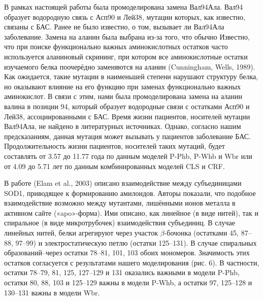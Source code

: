 В рамках настоящей работы была промоделирована замена Вал94Ала. Вал94 образует водородную связь с Асп90 и Лей38, мутации которых, как известно, связаны с БАС. Ранее не было известно, о том, вызывает ли Вал94Ала заболевание. Замена на аланин была выбрана из-за того, что обычно
Известно, что при поиске функционально важных аминокислотных остатков часто используется аланиновый скрининг, при котором все аминокислотные остатки изучаемого белка поочерёдно заменяются на аланин (Cunningham, Wells, 1989). Как ожидается, такие мутации в наименьшей степени нарушают структуру белка, но оказывают влияние на его функцию при заменах функционально важных аминокислот. В связи с этим, нами была промоделирована замена на аланин валина в позиции 94,  который образует водородные связи с остатками Асп90 и Лей38, ассоциированными с БАС. Время жизни пациентов, носителей мутации Вал94Ала, не найдено в литературных источниках. Однако, согласно нашим предсказаниям, данная мутация может вызывать у пациентов заболевание БАС. Продолжительность жизни пациентов, носителей таких мутаций, будет составлять от 3.57 до 11.77 года по данным моделей P-Phb, P-Whb и Wbr или от 4.09 до 5.71 лет по данным комбинированных моделей CLS и CRF. 

В работе (Elam et al., 2003) описано взаимодействие между субъединицами SOD1, приводящее к формированию амилоидов. Авторы показали, что подобное взаимодействие возможно между мутантами, лишёнными ионов металла в активном сайте («apo»-форма). Ими описано, как линейное (в виде нитей), так и спиральное (в виде микротрубочек) взаимодействия субъединиц. В случае линейных нитей, белки агрегируют через участок $\beta$-бочонка (остатками 45, 87–88, 97–99) и электростатическую петлю (остатки 125–131). В случае спиральных образований--через остатки 78–81, 101, 103 обоих мономеров. Значимость этих остатков согласуется с результатами нашего моделирования (рис. 6). В частности, остатки 78–79, 81, 125, 127–129 и 131 оказались важными в модели P-Phb, остатки 80, 88, 103 и 125–129 важны в модели P-Whb, а остатки 97, 125–128 и 130–131 важны в модели Wbr. 

